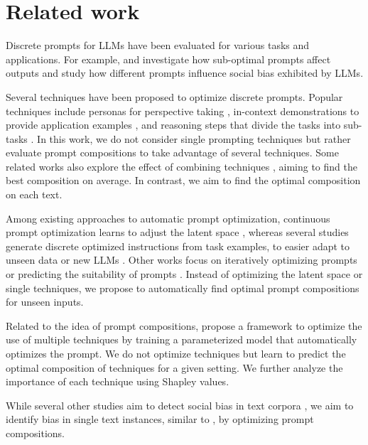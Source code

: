 \section{Related work}
\label{sec:related-work}

Discrete prompts for LLMs have been evaluated for various tasks and applications. For example,  \citet{zamfirescu-pereira2023} and \citet{arroyo2024} investigate how sub-optimal prompts affect outputs and \citet{hida2024} study how different prompts influence social bias exhibited by LLMs.

Several techniques have been proposed to optimize discrete prompts. Popular techniques include personas for perspective taking \cite{sheng2021,xu2023,liu2024}, in-context demonstrations to provide application examples \cite{dong2024}, and reasoning steps that divide the tasks into sub-tasks \cite{wei2022}. In this work, we do not consider single prompting techniques but rather evaluate prompt compositions to take advantage of several techniques. Some related works also explore the effect of combining techniques \cite{stahl:2024}, aiming to find the best composition on average. In contrast, we aim to find the optimal composition on each text.

Among existing approaches to automatic prompt optimization, continuous prompt optimization learns to adjust the latent space \cite{li2021b,liu2022a}, whereas several studies generate discrete optimized instructions from task examples, to easier adapt to unseen data \cite{zhou2023,honovich2023,ha2023} or new LLMs \cite{memon2024}. Other works focus on iteratively optimizing prompts \cite{zhang2022,shum2023,tian2024} or predicting the suitability of prompts  \cite{yang2024}.
Instead of optimizing the latent space or single techniques, we propose to automatically find optimal prompt compositions for unseen inputs.

Related to the idea of prompt compositions, \citet{khattab2023} propose a framework to optimize the use of multiple techniques by training a parameterized model that automatically optimizes the prompt. We do not optimize techniques but learn to predict the optimal composition of techniques for a given setting. We further analyze the importance of each technique using Shapley values.

While several other studies aim to detect social bias in text corpora \cite{spliethover2020,asr2021,toroisaza2023,derner2024}, we aim to identify bias in single text instances, similar to \citet{schick2021,spliethover2024,powers2024}, by optimizing prompt compositions.

